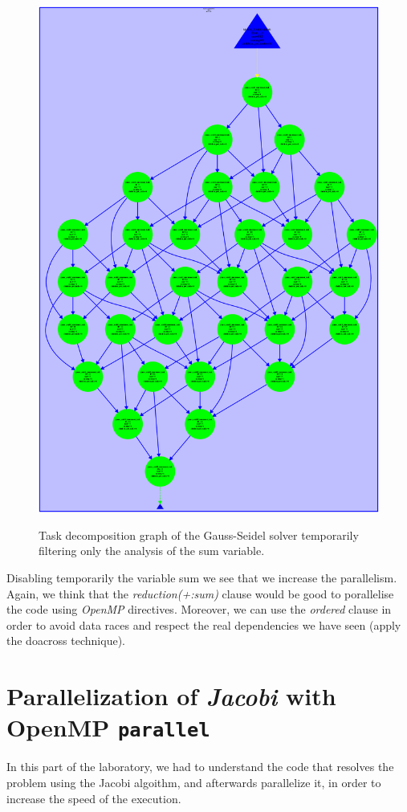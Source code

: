 \documentclass[12pt, a4paper]{article}
\begin{document}
\begin{figure}[H]
	\centering
	\includegraphics[scale=0.20]{./images/tareador-gauss-seidel-2b-sum}
	\label{fig:TDGGauss-Seidel-disable-sum}
	\caption{Task decomposition graph of the Gauss-Seidel solver temporarily filtering only the analysis of the sum variable.}
\end{figure}

Disabling temporarily the variable sum we see that we increase the parallelism. Again, we think that the \textit{reduction(+:sum)} clause would be good to porallelise the code using \textit{OpenMP} directives. Moreover, we can use the \textit{ordered} clause in order to avoid data races and respect the real dependencies we have seen (apply the doacross technique).


\section{Parallelization of \textit{Jacobi} with OpenMP \texttt{parallel}}
In this part of the laboratory, we had to understand the code that resolves the problem using the Jacobi algoithm, and afterwards parallelize it, in order to increase the speed of the execution.
\end{document}

